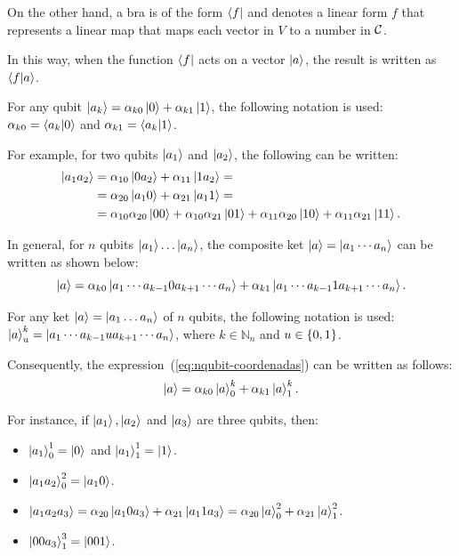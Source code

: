 \documentclass[sigconf,natbib=false]{acmart}
\begin{document}
	On the other hand, a bra is of the form $\bra{f}$ and denotes a linear form $f$ that represents a linear map that maps each vector in $V$
	to a number in $\mathcal{C}$.
 
	In this way,  when the function $\bra{f}$ acts on a vector $\ket{a}$, the result  is written as $\braket{f}{a}$.

	\begin{notation}
		For any qubit $\ket{a_k}=\alpha_{k0}\ket{0} +\alpha_{k1} \ket{1}$, the following notation is used:
		$\alpha_{k0}=\braket{a_k}{0}$ and $\alpha_{k1}=\braket{a_k}{1}$.
	\end{notation}

	For example, for two qubits $\ket{a_1}$ and $\ket{a_2}$, the following can be written:
	\begin{align}
		\label{eq:2qubit-coordenadas}
		\ket{a_1a_2}&=\alpha_{10}\ket{0a_2}+\alpha_{11}\ket{1a_2}=\\
		&=\alpha_{20}\ket{a_10}+\alpha_{21}\ket{a_11}=\\
		&=\alpha_{10} \alpha_{20}\ket{00}+\alpha_{10} \alpha_{21}\ket{01}+\alpha_{11} \alpha_{20}\ket{10}+\alpha_{11} \alpha_{21}\ket{11}.
	\end{align}

	In general, for $n$ qubits $\ket{a_1}\dots\ket{a_n}$, the composite ket  $\ket{a}=\ket{a_1\cdots a_n}$  can be written as shown below:
	\begin{equation}
		\label{eq:nqubit-coordenadas}
		\ket{a}=\alpha_{k0}\ket{a_1\cdots a_{k-1}0a_{k+1}\cdots a_n}+\alpha_{k1}\ket{a_1\cdots a_{k-1}1a_{k+1}\cdots a_n}.
	\end{equation}

	\begin{notation}
		For any ket $\ket{a}=\ket{a_1\dots a_n}$ of $n$ qubits, the following notation is used:
		$\ket{a}^{k}_{u} = \ket{a_1\cdots a_{k-1}u a_{k+1}\cdots a_n}$, where $k \in \mathbb{N}_n$ and $u\in\{0,1\}$.
	\end{notation}

	Consequently, the expression~(\ref{eq:nqubit-coordenadas}) can be written as follows:
	\begin{equation}
		\label{eq:canonical-state}
		\ket{a}= \alpha_{k0}\ket{a}^{k}_{0}+\alpha_{k1}\ket{a}^{k}_{1}.
	\end{equation}

	For instance, if $\ket{a_1},\ket{a_2}$ and $\ket{a_3}$ are three qubits, then:
	\begin{itemize}
		\item $\ket{a_1}^{1}_{0}=\ket{0}$ and $\ket{a_1}^{1}_{1}=\ket{1}$.
		\item $\ket{a_1 a_2}^{2}_{0}=\ket{a_1 0}$.
		\item $\ket{a_1 a_2 a_3}=\alpha_{20}\ket{a_1 0 a_3}+\alpha_{21}\ket{a_1 1 a_3}=\alpha_{20}\ket{a}^{2}_{0}+\alpha_{21}\ket{a}^{2}_{1}$.
		\item $\ket{00a_3}^{3}_{1}=\ket{001}$.
	\end{itemize}
\end{document}
